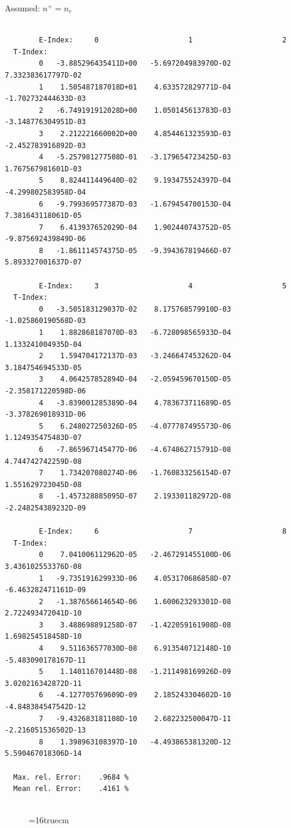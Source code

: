 \documentclass[12pt,dvips]{article}
\begin{document}
Assumed:  $n^+ = n_e$
\begin{small}\begin{verbatim}

        E-Index:     0                     1                     2
  T-Index:
        0   -3.885296435411D+00   -5.697204983970D-02    7.332383617797D-02
        1    1.505487187018D+01    4.633572829771D-04   -1.702732444633D-03
        2   -6.749191912028D+00    1.050145613783D-03   -3.148776304951D-03
        3    2.212221660002D+00    4.854461323593D-03   -2.452783916892D-03
        4   -5.257981277508D-01   -3.179654723425D-03    1.767567981601D-03
        5    8.824411449640D-02    9.193475524397D-04   -4.299802583958D-04
        6   -9.799369577387D-03   -1.679454700153D-04    7.381643118061D-05
        7    6.413937652029D-04    1.902440743752D-05   -9.875692439849D-06
        8   -1.861114574375D-05   -9.394367819466D-07    5.893327001637D-07

        E-Index:     3                     4                     5
  T-Index:
        0   -3.505183129037D-02    8.175768579910D-03   -1.025860190568D-03
        1    1.882868187070D-03   -6.728098565933D-04    1.133241004935D-04
        2    1.594704172137D-03   -3.246647453262D-04    3.184754694533D-05
        3    4.064257852894D-04   -2.059459670150D-05   -2.358171220598D-06
        4   -3.839001285389D-04    4.783673711689D-05   -3.378269018931D-06
        5    6.248027250326D-05   -4.077787495573D-06    1.124935475483D-07
        6   -7.865967145477D-06   -4.674862715791D-08    4.744742742259D-08
        7    1.734207080274D-06   -1.760833256154D-07    1.551629723045D-08
        8   -1.457328885095D-07    2.193301182972D-08   -2.248254389232D-09

        E-Index:     6                     7                     8
  T-Index:
        0    7.041006112962D-05   -2.467291455100D-06    3.436102553376D-08
        1   -9.735191629933D-06    4.053170686858D-07   -6.463282471161D-09
        2   -1.387656614654D-06    1.600623293301D-08    2.722493472041D-10
        3    3.488698891258D-07   -1.422059161908D-08    1.698254518458D-10
        4    9.511636577030D-08    6.913540712148D-10   -5.483090178167D-11
        5    1.140116701448D-08   -1.211498169926D-09    3.020216342872D-11
        6   -4.127705769609D-09    2.185243304602D-10   -4.848384547542D-12
        7   -9.432683181108D-10    2.682232500047D-11   -2.216051536502D-13
        8    1.398963108397D-10   -4.493865381320D-12    5.590467018306D-14

  Max. rel. Error:    .9684 %
  Mean rel. Error:    .4161 %


\end{verbatim}\end{small}
\begin{figure} \label{2.1.5_equil}
\epsfxsize=16truecm
\end{figure}
\newpage
\end{document}
